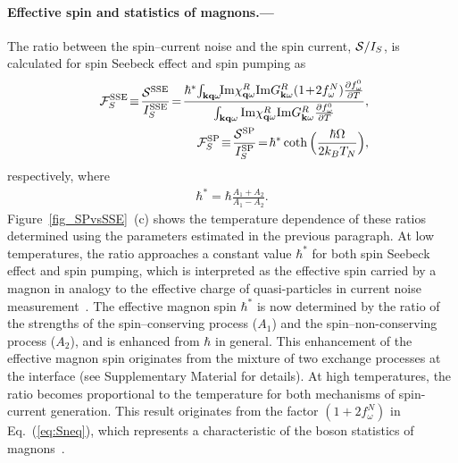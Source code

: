 \documentclass[aps,prl,reprint,showpacs]{revtex4-1}
\def\v#1{\mathbf{#1}}
\def\q{\v{q}} 					%
\def\k{\v{k}} 					%
\def\del{\partial}
\def\IM{{\rm Im}} %
\def\IsSSE{I_S^{\rm SSE}}
\def\IsSP{I_S^{\rm SP}}
\def\SSSE{\mathcal{S}^{\rm SSE}}
\def\SSP{\mathcal{S}^{\rm SP}}
\begin{document}
\paragraph{Effective spin and statistics of magnons.---}
The ratio between the spin--current noise and the spin current, ${\cal S}/I_S$,
is calculated for spin Seebeck effect and spin pumping as
\begin{eqnarray}
& & \!\!\!\! {\cal F}_S^{\rm SSE} \! \equiv \! \frac{\SSSE }{ \IsSSE }  \! =\!
\frac{ \hbar^*\! \int_{\k\q\omega} \! \!\IM \chi^R_{\q \omega} \IM G^R_{\k\omega} (1\! +\! 2f^N_\omega )\frac{\del f^0_\omega}{\del T} }{ \int_{\k\q\omega} \IM \chi^R_{\q \omega} \IM G^R_{\k\omega} \frac{\del f^0_\omega}{\del T} }, \\
\label{S-Is-SSE}
& & \!\!\!\! {\cal F}_S^{\rm SP} \! \equiv \! \frac{\SSP }{ \IsSP } \! =\! \hbar^*
\coth \Big( \frac{\hbar \Omega}{2k_B T_N} \Big),
\end{eqnarray}
respectively, where
\begin{eqnarray}
\hbar^* = \hbar \frac{A_1 \! + \! A_2}{A_1 \! - \! A_2}.
\end{eqnarray}
Figure~\ref{fig_SPvsSSE}~(c) shows the temperature dependence of these ratios determined 
using the parameters estimated in the previous paragraph.
At low temperatures, the ratio approaches a constant value $\hbar^*$
for both spin Seebeck effect and spin pumping, which is interpreted 
as the effective spin carried by a magnon in analogy to
the effective charge of quasi-particles in current noise measurement~\cite{Kamra16a,Kamra16b}.
The effective magnon spin $\hbar^*$ is now determined by 
the ratio of the strengths of the spin--conserving process ($A_1$) 
and the spin--non-conserving process ($A_2$), and is enhanced from $\hbar$ in general.
This enhancement of the effective magnon spin originates from the mixture of two exchange processes
at the interface (see Supplementary Material for details).
At high temperatures, the ratio becomes proportional to the temperature 
for both mechanisms of spin-current generation. 
This result originates from the factor $(1+2f_\omega^N)$ in Eq.~(\ref{eq:Sneq}), which
represents a characteristic of the boson statistics of magnons~\cite{Aftergood17}.
\end{document}
